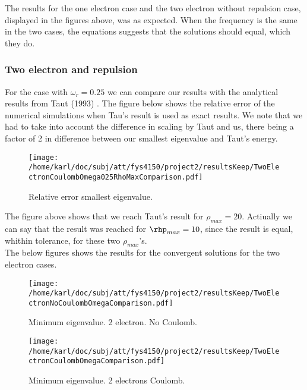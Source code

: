 \documentclass{article}
\begin{document}
The results for the one electron case and the two electron without repulsion case, displayed in the figures above, was as expected. When the frequency is the same in the two cases, the equations suggests that the solutions should equal, which they do.

\subsubsection{Two electron and repulsion}
For the case with $\omega_r = 0.25$ we can compare our results with the analytical results from Taut (1993) \cite{taut}. The figure below shows the relative error of the numerical simulations when Tau's result is used as exact results. We note that we had to take into account the difference in scaling by Taut and us, there being a factor of 2 in difference between our smallest eigenvalue and Taut's energy.

\begin{figure}[H]
	\centering
	\texttt{[image: /home/karl/doc/subj/att/fys4150/project2/resultsKeep/TwoElectronCoulombOmega025RhoMaxComparison.pdf]}
	\caption{Relative error smallest eigenvalue.}
	\label{1}
\end{figure}

The figure above shows that we reach Taut's result for $\rho_{max} = 20$. Actiually we can say that the result was reached for $\rhp_{max} = 10$, since the result is equal, whithin tolerance, for these two $\rho_{max}$'s. \\

The below figures shows the results for the convergent solutions for the two electron cases.

\begin{minipage}{.49\textwidth} %
	\begin{figure}[H]
		\centering
		\texttt{[image: /home/karl/doc/subj/att/fys4150/project2/resultsKeep/TwoElectronNoCoulombOmegaComparison.pdf]}
		\caption{Minimum eigenvalue. 2 electron. No Coulomb.}
		\label{1}
	\end{figure}
\end{minipage}\hfill
\vspace{2ex}
\begin{minipage}{.49\textwidth}
	\begin{figure}[H]
		\centering
		\texttt{[image: /home/karl/doc/subj/att/fys4150/project2/resultsKeep/TwoElectronCoulombOmegaComparison.pdf]}
		\caption{Minimum eigenvalue. 2 electrons  Coulomb.}
		\label{1}
	\end{figure}
\end{minipage}\hfill
\vspace{2ex}
\end{document}
